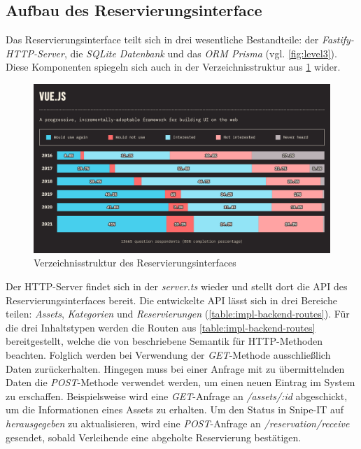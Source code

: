 \subsection{Aufbau des Reservierungsinterface}
\label{subsec:aufbauinterface}
Das Reservierungsinterface teilt sich in drei wesentliche Bestandteile: der
\textit{Fastify-HTTP-Server}, die \textit{SQLite Datenbank} und das \textit{ORM Prisma} (vgl.
\ref{fig:level3}). Diese Komponenten spiegeln sich auch in der Verzeichnisstruktur aus \ref{fig:db}
wider.
\begin{figure}[h]
  \centering
  \includegraphics[scale=0.2]{Bilder/vuejs.png}
  \caption[Verzeichnisstruktur des Reservierungsinterfaces]{Verzeichnisstruktur des Reservierungsinterfaces}
  \label{fig:db}
\end{figure}
Der HTTP-Server findet sich in der \textit{server.ts} wieder und stellt dort die API des
Reservierungsinterfaces bereit. Die entwickelte API lässt sich in drei Bereiche teilen:
\textit{Assets}, \textit{Kategorien} und \textit{Reservierungen} (\ref{table:impl-backend-routes}).
Für die drei Inhaltstypen werden die Routen aus \ref{table:impl-backend-routes} bereitgestellt,
welche die von  beschriebene Semantik für HTTP-Methoden beachten.
Folglich werden bei Verwendung der \textit{GET}-Methode ausschließlich Daten zurückerhalten.
Hingegen muss bei einer Anfrage mit zu übermittelnden Daten die \textit{POST}-Methode verwendet
werden, um einen neuen Eintrag im System zu erschaffen. Beispielsweise wird eine
\textit{GET}-Anfrage an \textit{/assets/:id} abgeschickt, um die Informationen eines Assets zu
erhalten. Um den Status in Snipe-IT auf \textit{herausgegeben} zu aktualisieren, wird eine
\textit{POST}-Anfrage an \textit{/reservation/receive} gesendet, sobald Verleihende eine abgeholte
Reservierung bestätigen.

